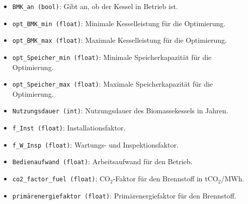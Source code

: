 \begin{itemize}
    \item \texttt{BMK\_an (bool)}: Gibt an, ob der Kessel in Betrieb ist.
    \item \texttt{opt\_BMK\_min (float)}: Minimale Kesselleistung für die Optimierung.
    \item \texttt{opt\_BMK\_max (float)}: Maximale Kesselleistung für die Optimierung.
    \item \texttt{opt\_Speicher\_min (float)}: Minimale Speicherkapazität für die Optimierung.
    \item \texttt{opt\_Speicher\_max (float)}: Maximale Speicherkapazität für die Optimierung.
    \item \texttt{Nutzungsdauer (int)}: Nutzungsdauer des Biomassekessels in Jahren.
    \item \texttt{f\_Inst (float)}: Installationsfaktor.
    \item \texttt{f\_W\_Insp (float)}: Wartungs- und Inspektionsfaktor.
    \item \texttt{Bedienaufwand (float)}: Arbeitsaufwand für den Betrieb.
    \item \texttt{co2\_factor\_fuel (float)}: CO$_2$-Faktor für den Brennstoff in tCO$_2$/MWh.
    \item \texttt{primärenergiefaktor (float)}: Primärenergiefaktor für den Brennstoff.
\end{itemize}


